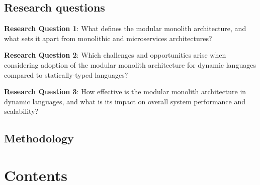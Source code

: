 \documentclass[12pt]{article}
\begin{document}
	\subsection*{Research questions}\label{subsec:research-questions}

	\textbf{Research Question 1}: What defines the modular monolith architecture, and what sets it apart from monolithic and microservices architectures?

	\textbf{Research Question 2}: Which challenges and opportunities arise when considering adoption of the modular monolith architecture for dynamic languages compared to statically-typed languages?

	\textbf{Research Question 3}: How effective is the modular monolith architecture in dynamic languages, and what is its impact on overall system performance and scalability?

	\subsection*{Methodology}\label{subsec:methodology}

	\clearpage

	\section*{Contents}\label{sec:contents}
\end{document}
